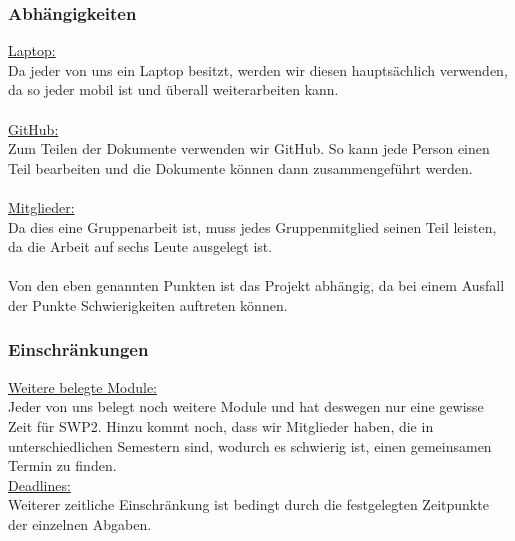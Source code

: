 \documentclass[fontsize=12pt,paper=a4,twoside]{scrartcl}
\begin{document}
\subsubsection{Abhängigkeiten}

\underline{Laptop:} \\
Da jeder von uns ein Laptop besitzt, werden wir diesen hauptsächlich verwenden, da so jeder mobil ist und überall weiterarbeiten kann.\\
\bigskip \\
\underline{GitHub:} \\
Zum Teilen der Dokumente verwenden wir GitHub. So kann jede Person einen Teil bearbeiten und die Dokumente können dann zusammengeführt werden. \\
\bigskip \\
\underline{Mitglieder:} \\
Da dies eine Gruppenarbeit ist, muss jedes Gruppenmitglied seinen Teil leisten, da die Arbeit auf sechs Leute ausgelegt ist. \\
\bigskip \\
Von den eben genannten Punkten ist das Projekt abhängig, da bei einem Ausfall der Punkte Schwierigkeiten auftreten können.

\subsubsection{Einschränkungen}
\underline{Weitere belegte Module:} \\
Jeder von uns belegt noch weitere Module und hat deswegen nur eine gewisse Zeit für SWP2. Hinzu kommt noch, dass wir Mitglieder haben, die in unterschiedlichen Semestern sind, wodurch es schwierig ist, einen gemeinsamen Termin zu finden. \\

\underline{Deadlines:} \\
Weiterer zeitliche Einschränkung ist bedingt durch die festgelegten Zeitpunkte der einzelnen Abgaben.

\newpage
\end{document}
